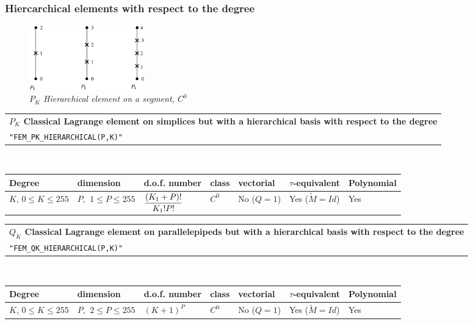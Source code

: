 \documentclass[11pt,a4paper]{article}
\begin{document}
\subsubsection{Hiercarchical elements with respect to the degree}

\begin{figure}[H]
  \begin{center}
    \includegraphics[width=5cm,angle=0]{getfemlist_segment_hier.eps}
  \end{center}
  \caption{ \it $P_K$ Hierarchical element on a segment, $C^0$} 
  \label{fig:seg_hier}
\end{figure}


\begin{center}
\begin{tabular}{|m{16.109cm}|} \hline 
{\bf $P_{K}$ Classical Lagrange element on simplices but with a hierarchical basis with respect to the degree}\\
{\tt "FEM\_PK\_HIERARCHICAL(P,K)"} 
\end{tabular} \\ \vspace{-1pt} 
\begin{tabular}{|m{2cm}|m{2cm}|m{2.5cm}|m{1.5cm}|m{1.5cm}|m{2cm}|m{2cm}|} \hline 
Degree & dimension & d.o.f. number & class & vectorial & \mbox{$\tau$-equivalent} & Polynomial\\ \hline
\small \mbox{$K$}, \small \mbox{$0 \leq K\leq 255$} & \small $P$, \mbox{$\ 1 \leq P \leq 255$} & \mbox{${\displaystyle \frac{\displaystyle (K_1+P)!}{\displaystyle K_1! P!}}$} & $C^0$ & No \mbox{($Q = 1$)} & Yes \mbox{($\tilde{M} = Id$)}  & Yes\\ \hline
\end{tabular}
\end{center}

\begin{center}
\begin{tabular}{|m{16.109cm}|} \hline 
{\bf $Q_{K}$ Classical Lagrange element on parallelepipeds but with a hierarchical basis with respect to the degree}\\
{\tt "FEM\_QK\_HIERARCHICAL(P,K)"} 
\end{tabular} \\ \vspace{-1pt} 
\begin{tabular}{|m{2cm}|m{2cm}|m{2.5cm}|m{1.5cm}|m{1.5cm}|m{2cm}|m{2cm}|} \hline 
Degree & dimension & d.o.f. number & class & vectorial & \mbox{$\tau$-equivalent} & Polynomial\\ \hline
\small \mbox{$K$}, \small \mbox{$0 \leq K\leq 255$} & \small $P$, \mbox{$\ 2 \leq P \leq 255$} & \mbox{$(K+1)^P$} & $C^0$ & No \mbox{($Q = 1$)} & Yes \mbox{($\tilde{M} = Id$)}  & Yes\\ \hline
\end{tabular}
\end{center}
\end{document}
